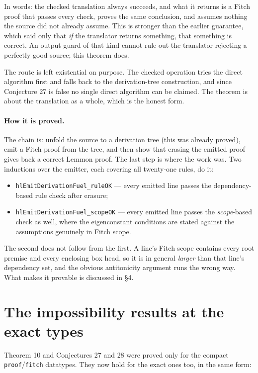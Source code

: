 \documentclass[11pt]{article}
\theoremstyle{plain}
\newcommand{\isa}[1]{\texttt{\small #1}}
\begin{document}
\noindent
In words: the checked translation always succeeds, and what it returns is a
Fitch proof that passes every check, proves the same conclusion, and assumes
nothing the source did not already assume. This is stronger than the earlier
guarantee, which said only that \emph{if} the translator returns something,
that something is correct. An output guard of that kind cannot rule out the
translator rejecting a perfectly good source; this theorem does.

The route is left existential on purpose. The checked operation tries the
direct algorithm first and falls back to the derivation-tree construction, and
since Conjecture 27 is false no single direct algorithm can be claimed. The
theorem is about the translation as a whole, which is the honest form.

\paragraph{How it is proved.} The chain is: unfold the source to a derivation
tree (this was already proved), emit a Fitch proof from the tree, and then show
that erasing the emitted proof gives back a correct Lemmon proof. The last step
is where the work was. Two inductions over the emitter, each covering all
twenty-one rules, do it:

\begin{itemize}
\item \isa{hlEmitDerivationFuel\_ruleOK} --- every emitted line passes the
  dependency-based rule check after erasure;
\item \isa{hlEmitDerivationFuel\_scopeOK} --- every emitted line passes the
  \emph{scope}-based check as well, where the eigenconstant conditions are
  stated against the assumptions genuinely in Fitch scope.
\end{itemize}

The second does not follow from the first. A line's Fitch scope contains every
root premise and every enclosing box head, so it is in general \emph{larger}
than that line's dependency set, and the obvious antitonicity argument runs the
wrong way. What makes it provable is discussed in \S4.

\section{The impossibility results at the exact types}

Theorem 10 and Conjectures 27 and 28 were proved only for the compact
\isa{proof}/\isa{fitch} datatypes. They now hold for the exact ones too, in the
same form:
\end{document}
